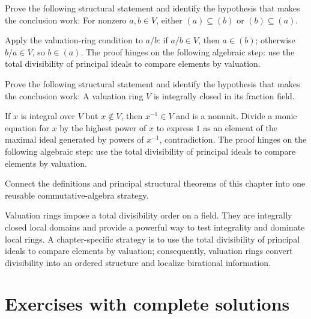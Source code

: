 \begin{problem}\label{prob:v21-problem-10}
Prove the following structural statement and identify the hypothesis that makes the conclusion work: For nonzero $a,b\in V$, either $(a)\subseteq(b)$ or $(b)\subseteq(a)$.
\end{problem}
\begin{solution}
Apply the valuation-ring condition to $a/b$: if $a/b\in V$, then $a\in(b)$; otherwise $b/a\in V$, so $b\in(a)$. The proof hinges on the following algebraic step: use the total divisibility of principal ideals to compare elements by valuation.
\end{solution}

\begin{problem}\label{prob:v21-problem-11}
Prove the following structural statement and identify the hypothesis that makes the conclusion work: A valuation ring $V$ is integrally closed in its fraction field.
\end{problem}
\begin{solution}
If $x$ is integral over $V$ but $x\notin V$, then $x^{-1}\in V$ and is a nonunit. Divide a monic equation for $x$ by the highest power of $x$ to express $1$ as an element of the maximal ideal generated by powers of $x^{-1}$, contradiction. The proof hinges on the following algebraic step: use the total divisibility of principal ideals to compare elements by valuation.
\end{solution}

\begin{problem}\label{prob:v21-problem-12}
Connect the definitions and principal structural theorems of this chapter into one reusable commutative-algebra strategy.
\end{problem}
\begin{solution}
Valuation rings impose a total divisibility order on a field. They are integrally closed local domains and provide a powerful way to test integrality and dominate local rings. A chapter-specific strategy is to use the total divisibility of principal ideals to compare elements by valuation; consequently, valuation rings convert divisibility into an ordered structure and localize birational information.
\end{solution}

\section{Exercises with complete solutions}

